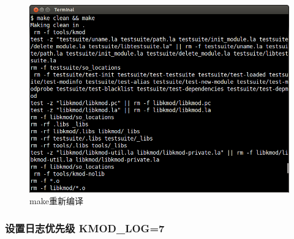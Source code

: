 \documentclass[11pt,a4paper]{article}
\makeatletter
\def\maxwidth{\ifdim\Gin@nat@width>\linewidth\linewidth
\else\Gin@nat@width\fi}
\let\Oldincludegraphics\includegraphics
\renewcommand{\includegraphics}[1]{\Oldincludegraphics[width=\maxwidth]{#1}}
\makeatother
\begin{document}
\begin{figure}[htbp]
\centering
\includegraphics{./pictures/2-2-make.png}
\caption{make重新编译}
\end{figure}

\subsubsection{设置日志优先级 KMOD\_LOG=7}
\end{document}
